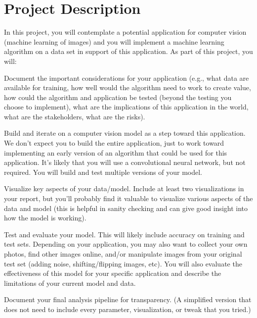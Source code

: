\documentclass{tufte-handout}
\begin{document}
\section*{Project Description}
In this project, you will contemplate a potential application for computer vision (machine learning of images) and you will implement a machine learning algorithm on a data set in support of this application. As part of this project, you will:
\bi[leftmargin=.5in]
\item Document the important considerations for your application (e.g., what data are available for training, how well would the algorithm need to work to create value, how could the algorithm and application be tested (beyond the testing you choose to implement), what are the implications of this application in the world, what are the stakeholders, what are the risks). 
\item Build and iterate on a computer vision model as a step toward this application. We don’t expect you to build the entire application, just to work toward implementing an early version of an algorithm that could be used for this application. It’s likely that you will use a convolutional neural network, but not required. You will build and test multiple versions of your model.
\item Visualize key aspects of your data/model. Include at least two visualizations in your report, but you’ll probably find it valuable to visualize various aspects of the data and model (this is helpful in sanity checking and can give good insight into how the model is working). 
\item Test and evaluate your model. This will likely include accuracy on training and test sets. Depending on your application, you may also want to collect your own photos, find other images online, and/or manipulate images from your original test set (adding noise, shifting/flipping images, etc). You will also evaluate the effectiveness of this model for your specific application and describe the limitations of your current model and data.
\item Document your final analysis pipeline for transparency. (A simplified version that does not need to include every parameter, visualization, or tweak that you tried.)
\ei
\end{document}
